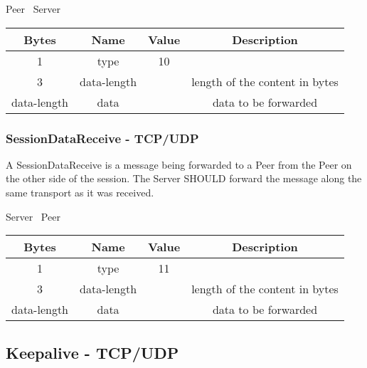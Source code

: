 \begin{center}
    Peer \textrightarrow\ Server\\
    \begin{tabular}{|c|c|c|c|}
        \hline
        \textbf{Bytes} & \textbf{Name} & \textbf{Value} & \textbf{Description}           \\
        \hline
        1              & type          & 10             &                                \\
        \hline
        3              & data-length   &                & length of the content in bytes \\
        \hline
        data-length    & data          &                & data to be forwarded           \\
        \hline
    \end{tabular}
\end{center}

\subsubsection{SessionDataReceive - TCP/UDP}

A SessionDataReceive is a message being forwarded to a Peer from the Peer on the other side of the
session. The Server SHOULD forward the message along the same transport as it was received.

\begin{center}
    Server \textrightarrow\ Peer\\
    \begin{tabular}{|c|c|c|c|}
        \hline
        \textbf{Bytes} & \textbf{Name} & \textbf{Value} & \textbf{Description}           \\
        \hline
        1              & type          & 11             &                                \\
        \hline
        3              & data-length   &                & length of the content in bytes \\
        \hline
        data-length    & data          &                & data to be forwarded           \\
        \hline
    \end{tabular}
\end{center}

\subsection{Keepalive - TCP/UDP}

